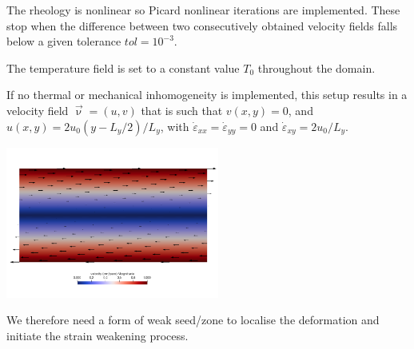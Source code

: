 The rheology is nonlinear so Picard nonlinear iterations are implemented. These stop
when the difference between two consecutively obtained velocity fields falls below
a given tolerance $tol=10^{-3}$. 

The temperature field is set to a constant value $T_0$ throughout the domain.

If no thermal or mechanical inhomogeneity is implemented, this setup results in 
a velocity field $\vec{\upnu}=(u,v)$ that is such that $v(x,y)=0$, and 
$u(x,y)=2u_0 (y-L_y/2)/L_y$, with $\dot{\varepsilon}_{xx}=\dot{\varepsilon}_{yy}=0$ 
and $\dot{\varepsilon}_{xy}=2u_0/L_y$. 

\begin{center}
\includegraphics[width=7cm]{python_codes/fieldstone_121/results/vel}
\end{center}

We therefore need a form of weak seed/zone to localise the deformation and 
initiate the strain weakening process.





